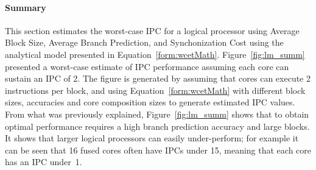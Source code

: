 \paragraph{Summary}

This section estimates the worst-case IPC for a logical processor using Average Block Size, Average Branch Prediction, and Synchonization Cost using the analytical model presented in Equation~\ref{form:wcetMath}.
Figure~\ref{fig:lm_summ} presented a worst-case estimate of IPC performance assuming each core can sustain an IPC of 2.
The figure is generated by assuming that cores can execute 2 instructions per block, and using Equation~\ref{form:wcetMath} with different block sizes, accuracies and core composition sizes to generate estimated IPC values.
From what was previously explained, Figure~\ref{fig:lm_summ} shows that to obtain optimal performance requires a high branch prediction accuracy and large blocks.
It shows that larger logical processors can easily under-perform; for example it can be seen that 16 fused cores often have IPCs under 15, meaning that each core has an IPC under~1.

